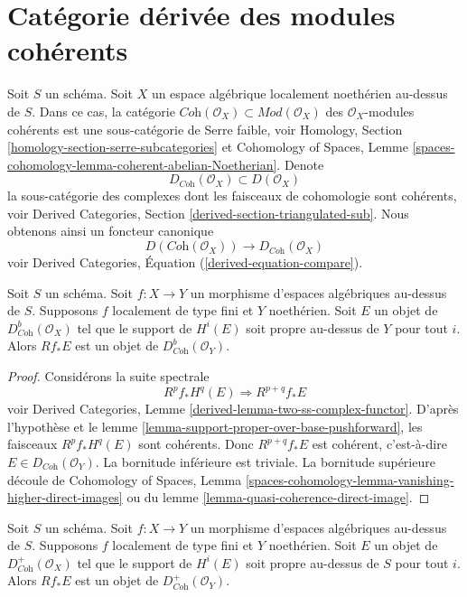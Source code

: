 \section{Catégorie dérivée des modules cohérents}
\label{section-derived-coherent}

\noindent
Soit $S$ un schéma. Soit $X$ un espace algébrique localement noethérien au-dessus de $S$.
Dans ce cas, la catégorie
$\textit{Coh}(\mathcal{O}_X) \subset \textit{Mod}(\mathcal{O}_X)$
des $\mathcal{O}_X$-modules cohérents est une sous-catégorie de Serre faible, voir
Homology, Section \ref{homology-section-serre-subcategories}
et
Cohomology of Spaces, Lemme
\ref{spaces-cohomology-lemma-coherent-abelian-Noetherian}.
Denote
$$
D_{\textit{Coh}}(\mathcal{O}_X) \subset D(\mathcal{O}_X)
$$
la sous-catégorie des complexes dont les faisceaux de cohomologie sont cohérents, voir
Derived Categories, Section \ref{derived-section-triangulated-sub}.
Nous obtenons ainsi un foncteur canonique
\begin{equation}
\label{equation-compare-coherent}
D(\textit{Coh}(\mathcal{O}_X))
\longrightarrow
D_{\textit{Coh}}(\mathcal{O}_X)
\end{equation}
voir Derived Categories, Équation (\ref{derived-equation-compare}).

\begin{lemma}
\label{lemma-direct-image-coherent}
Soit $S$ un schéma. Soit $f : X \to Y$ un morphisme d'espaces algébriques
au-dessus de $S$. Supposons $f$ localement de type fini et $Y$ noethérien.
Soit $E$ un objet de $D^b_{\textit{Coh}}(\mathcal{O}_X)$ tel que le
support de $H^i(E)$ soit propre au-dessus de $Y$ pour tout $i$.
Alors $Rf_*E$ est un objet de $D^b_{\textit{Coh}}(\mathcal{O}_Y)$.
\end{lemma}

\begin{proof}
Considérons la suite spectrale
$$
R^pf_*H^q(E) \Rightarrow R^{p + q}f_*E
$$
voir Derived Categories, Lemme \ref{derived-lemma-two-ss-complex-functor}.
D'après l'hypothèse et le lemme \ref{lemma-support-proper-over-base-pushforward},
les faisceaux $R^pf_*H^q(E)$ sont cohérents. Donc
$R^{p + q}f_*E$ est cohérent, c'est-à-dire $E \in D_{\textit{Coh}}(\mathcal{O}_Y)$.
La bornitude inférieure est triviale. La bornitude supérieure
découle de
Cohomology of Spaces, Lemma
\ref{spaces-cohomology-lemma-vanishing-higher-direct-images}
ou du
lemme \ref{lemma-quasi-coherence-direct-image}.
\end{proof}

\begin{lemma}
\label{lemma-direct-image-coherent-bdd-below}
Soit $S$ un schéma. Soit $f : X \to Y$ un morphisme d'espaces algébriques
au-dessus de $S$. Supposons $f$ localement de type fini et $Y$ noethérien.
Soit $E$ un objet de $D^+_{\textit{Coh}}(\mathcal{O}_X)$ tel que le support de $H^i(E)$
soit propre au-dessus de $S$ pour tout $i$.
Alors $Rf_*E$ est un objet de $D^+_{\textit{Coh}}(\mathcal{O}_Y)$.
\end{lemma}

